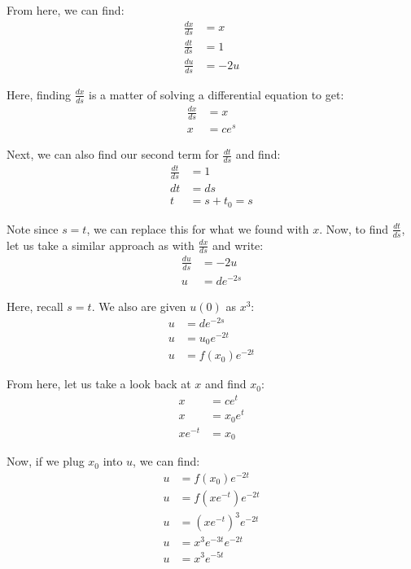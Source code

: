 \begin{enumerate}
  From here, we can find:
  \begin{align}
    \frac{dx}{ds} & = x\\
    \frac{dt}{ds} & = 1\\
    \frac{du}{ds} & = -2u
  \end{align}

  Here, finding $\frac{dx}{ds}$ is a matter of solving a differential equation to get:
  \begin{align}
    \frac{dx}{ds} & = x\\
    x & = ce^s
  \end{align}

  Next, we can also find our second term for $\frac{dt}{ds}$ and find:
  \begin{align}
    \frac{dt}{ds} & = 1\\
    dt & = ds\\
    t & = s + t_0 = s
  \end{align}

  Note since $s = t$, we can replace this for what we found with $x$.
  Now, to find
  $\frac{dt}{ds}$,
  let us take a similar approach as with
  $\frac{dx}{ds}$ and write:
  \begin{align}
    \frac{du}{ds} & = -2u\\
    u & = de^{-2s}
  \end{align}

  Here, recall $s = t$. We also are given $u(0)$ as $x^3$:
  \begin{align}
    u & = de^{-2s}\\
    u & = u_0 e^{-2t}\\
    u & = f\left( x_0 \right) e^{-2t}
  \end{align}

  From here, let us take a look back at $x$ and find $x_0$:
  \begin{align}
    x & = ce^t\\
    x & = x_0 e^t\\
    x e^{-t} & = x_0
  \end{align}

  Now, if we plug $x_0$ into $u$, we can find:
  \begin{align}
    u & = f\left( x_0 \right) e^{-2t}\\
    u & = f\left( x e^{-t} \right) e^{-2t}\\
    u & = \left(x e^{-t}\right)^3 e^{-2t}\\
    u & = x^3 e^{-3t} e^{-2t}\\
    u & = x^3 e^{-5t}
  \end{align}


\end{enumerate}
